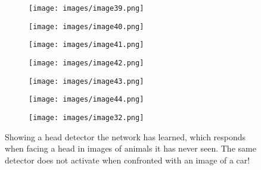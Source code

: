 \documentclass{article} \usepackage{lets_keepit_simple,times}
\begin{document}
\begin{figure}[h!]
  \centering
\begin{subfigure}[b]{0.31\linewidth}
  \texttt{[image: images/image39.png]}
\end{subfigure}
\begin{subfigure}[b]{0.31\linewidth}
  \texttt{[image: images/image40.png]}
\end{subfigure}
\begin{subfigure}[b]{0.31\linewidth}
  \texttt{[image: images/image41.png]}
\end{subfigure}

\begin{subfigure}[b]{0.31\linewidth}
  \texttt{[image: images/image42.png]}
\end{subfigure}
\begin{subfigure}[b]{0.31\linewidth}
  \texttt{[image: images/image43.png]}
\end{subfigure}
\begin{subfigure}[b]{0.31\linewidth}
  \texttt{[image: images/image44.png]}
\end{subfigure}

\begin{subfigure}[b]{0.93\linewidth}
  \texttt{[image: images/image32.png]}
\end{subfigure}
\caption{Showing a head detector the network has learned, which responds when facing a head in images of animals it has never seen. The same detector does not activate when confronted with an image of a car!}
\label{fig:horse_car}
\end{figure}
\end{document}
